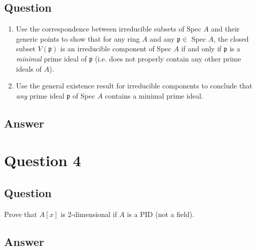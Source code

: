 \documentclass[11pt]{article}
\begin{document}
\subsection{Question}
\begin{enumerate}
\item Use the correspondence between irreducible subsets of Spec $A$ and their generic points to show that for any ring $A$ and any $\mathfrak{p} \in $ Spec $A$, the closed subset $V(\mathfrak{p})$ is an irreducible component of Spec $A$ if and only if $\mathfrak{p}$ is a \emph{minimal} prime ideal of $\mathfrak{p}$ (i.e. does not properly contain any other prime ideals of $A$).
\item  Use the general existence result for  irreducible components to conclude that \emph{any} prime ideal $\mathfrak{p}$ of Spec $A$ contains a minimal prime ideal.
\end{enumerate}
\subsection{Answer}

\section{Question 4}
\subsection{Question}
Prove that $A[x]$ is 2-dimensional if $A$ is a PID (not a field).
\subsection{Answer}
\end{document}
